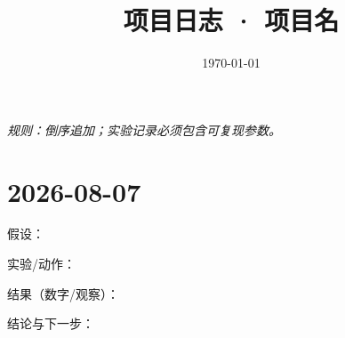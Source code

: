 \documentclass[11pt]{ctexart}
\title{项目日志 · 项目名}
\date{\today}
\begin{document}
\maketitle
\noindent\textit{规则：倒序追加；实验记录必须包含可复现参数。}

\section*{2026-08-07}
\begin{compactitem}
  \item 假设：
  \item 实验/动作：
  \item 结果（数字/观察）：
  \item 结论与下一步：
\end{compactitem}
\end{document}
